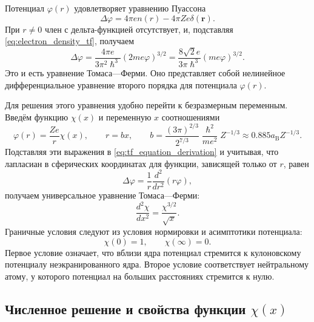 \documentclass[a4paper, 12pt]{article}
\numberwithin{equation}{section}
\begin{document}
Потенциал $\varphi(r)$ удовлетворяет уравнению Пуассона
\begin{equation}
\label{eq:poisson_tf}
\Delta \varphi = 4 \pi e n(r) - 4 \pi Z e \delta(\bm{r}).
\end{equation}
При $r \neq 0$ член с дельта-функцией отсутствует, и, подставляя \eqref{eq:electron_density_tf}, получаем
\begin{equation}
\label{eq:tf_equation_derivation}
\Delta \varphi = \frac{4 \pi e}{3 \pi^2 \hslash^3} (2 m e \varphi)^{3/2} = \frac{8 \sqrt{2} e}{3 \pi \hslash^3} (m e \varphi)^{3/2}.
\end{equation}
Это и есть уравнение Томаса---Ферми. Оно представляет собой нелинейное дифференциальное уравнение второго порядка для потенциала $\varphi(r)$.

Для решения этого уравнения удобно перейти к безразмерным переменным. Введём функцию $\chi(x)$ и переменную $x$ соотношениями
\begin{equation}
\label{eq:tf_dimensionless}
\varphi(r) = \frac{Z e}{r} \chi(x), \qquad r = b x, \qquad b = \frac{(3 \pi)^{2/3}}{2^{7/3}} \frac{\hslash^2}{m e^2} Z^{-1/3} \approx 0.885 a_{\text{B}} Z^{-1/3}.
\end{equation}
Подставляя эти выражения в \eqref{eq:tf_equation_derivation} и учитывая, что лапласиан в сферических координатах для функции, зависящей только от $r$, равен
\begin{equation}
\Delta \varphi = \frac{1}{r} \frac{d^2}{dr^2} (r \varphi),
\end{equation}
получаем универсальное уравнение Томаса---Ферми:
\begin{equation}
\label{eq:tf_universal}
\frac{d^2 \chi}{d x^2} = \frac{\chi^{3/2}}{\sqrt{x}}.
\end{equation}
Граничные условия следуют из условия нормировки и асимптотики потенциала:
\begin{equation}
\label{eq:tf_boundary}
\chi(0) = 1, \qquad \chi(\infty) = 0.
\end{equation}
Первое условие означает, что вблизи ядра потенциал стремится к кулоновскому потенциалу неэкранированного ядра. Второе условие соответствует нейтральному атому, у которого потенциал на больших расстояниях стремится к нулю.

\subsection{Численное решение и свойства функции $\chi(x)$}
\label{subsec:tf_numerical_solution}
\end{document}
